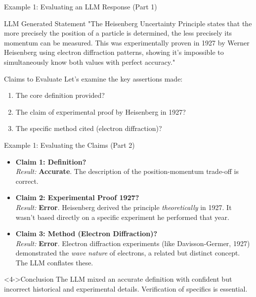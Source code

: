 \documentclass{beamer}
\begin{document}
\begin{frame}{Example 1: Evaluating an LLM Response (Part 1)}

\begin{block}{LLM Generated Statement}
"The Heisenberg Uncertainty Principle states that the more precisely the position of a particle is determined, the less precisely its momentum can be measured. This was experimentally proven in 1927 by Werner Heisenberg using electron diffraction patterns, showing it's impossible to simultaneously know both values with perfect accuracy."
\end{block}

\pause %

\begin{block}{Claims to Evaluate}
Let's examine the key assertions made:
\begin{enumerate}
  \item The core definition provided?
  \item The claim of experimental proof by Heisenberg in 1927?
  \item The specific method cited (electron diffraction)?
\end{enumerate}
\end{block}

\end{frame}

\begin{frame}{Example 1: Evaluating the Claims (Part 2)}

\begin{itemize}
    \item<1-> \textbf{Claim 1: Definition?} \\
        \textit{Result:} \textbf{Accurate}. The description of the position-momentum trade-off is correct.
    \pause %

    \item<2-> \textbf{Claim 2: Experimental Proof 1927?} \\
        \textit{Result:} \textbf{Error}. Heisenberg derived the principle \emph{theoretically} in 1927. It wasn't based directly on a specific experiment he performed that year.
    \pause %

    \item<3-> \textbf{Claim 3: Method (Electron Diffraction)?} \\
        \textit{Result:} \textbf{Error}. Electron diffraction experiments (like Davisson-Germer, 1927) demonstrated the \emph{wave nature} of electrons, a related but distinct concept. The LLM conflates these.
    \pause %
\end{itemize}

\begin{alertblock}<4->{Conclusion}
The LLM mixed an accurate definition with confident but incorrect historical and experimental details. Verification of specifics is essential.
\end{alertblock}

\end{frame}
\end{document}
